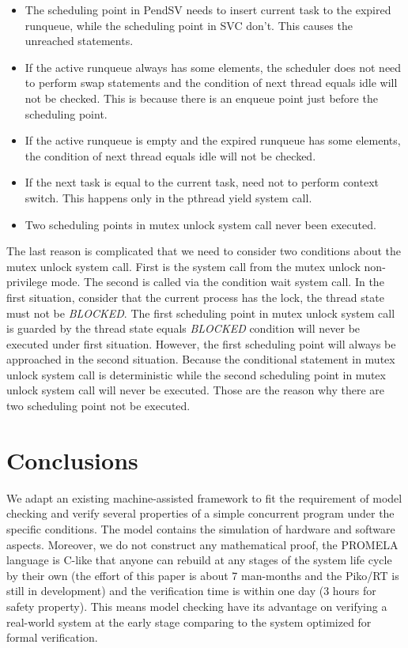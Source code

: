 \begin{itemize}
\item The scheduling point in PendSV needs to insert current task to the expired runqueue, while the scheduling point in SVC don't. This causes the unreached statements.
\item If the active runqueue always has some elements, the scheduler does not need to perform swap statements and the condition of next thread equals idle will not be checked. This is because there is an enqueue point just before the scheduling point.
\item If the active runqueue is empty and the expired runqueue has some elements, the condition of next thread equals idle will not be checked.
\item If the next task is equal to the current task, need not to perform context switch. This happens only in the pthread yield system call.
\item Two scheduling points in mutex unlock system call never been executed.
\end{itemize}

The last reason is complicated that we need to consider two conditions about the mutex unlock system call. First is the system call from the mutex unlock non-privilege mode. The second is called via the condition wait system call. In the first situation, consider that the current process has the lock, the thread state must not be \textit{BLOCKED}. The first scheduling point in mutex unlock system call is guarded by the thread state equals \textit{BLOCKED} condition will never be executed under first situation. However, the first scheduling point will always be approached in the second situation. Because the conditional statement in mutex unlock system call is deterministic while the second scheduling point in mutex unlock system call will never be executed. Those are the reason why there are two scheduling point not be executed.

\section{Conclusions}
We adapt an existing machine-assisted framework to fit the requirement of model checking and verify several properties of a simple concurrent program under the specific conditions. The model contains the simulation of hardware and software aspects. Moreover, we do not construct any mathematical proof, the PROMELA language is C-like that anyone can rebuild at any stages of the system life cycle by their own (the effort of this paper is about 7 man-months and the Piko/RT is still in development) and the verification time is within one day (3 hours for safety property). This means model checking have its advantage on verifying a real-world system at the early stage comparing to the system optimized for formal verification.

